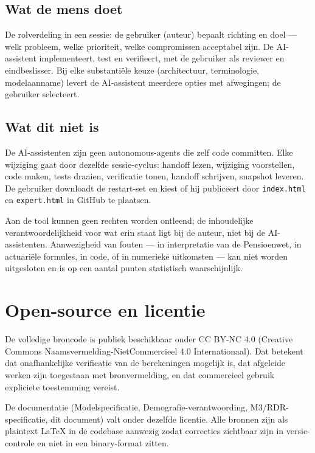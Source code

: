 \documentclass[11pt,a4paper]{article}
\newcommand{\code}[1]{\texttt{#1}}
\begin{document}
\subsection{Wat de mens doet}

De rolverdeling in een sessie: de gebruiker (auteur) bepaalt richting en doel --- welk probleem, welke prioriteit, welke compromissen acceptabel zijn. De AI-assistent implementeert, test en verifieert, met de gebruiker als reviewer en eindbeslisser. Bij elke substanti\"ele keuze (architectuur, terminologie, modelaanname) levert de AI-assistent meerdere opties met afwegingen; de gebruiker selecteert.

\subsection{Wat dit niet is}

De AI-assistenten zijn geen autonomous-agents die zelf code committen. Elke wijziging gaat door dezelfde sessie-cyclus: handoff lezen, wijziging voorstellen, code maken, tests draaien, verificatie tonen, handoff schrijven, snapshot leveren. De gebruiker downloadt de restart-set en kiest of hij publiceert door \code{index.html} en \code{expert.html} in GitHub te plaatsen.

Aan de tool kunnen geen rechten worden ontleend; de inhoudelijke verantwoordelijkheid voor wat erin staat ligt bij de auteur, niet bij de AI-assistenten. Aanwezigheid van fouten --- in interpretatie van de Pensioenwet, in actuari\"ele formules, in code, of in numerieke uitkomsten --- kan niet worden uitgesloten en is op een aantal punten statistisch waarschijnlijk.

\section{Open-source en licentie}
\label{sec:opensource}

De volledige broncode is publiek beschikbaar onder CC BY-NC 4.0 (Creative Commons Naamsvermelding-Niet\-Commercieel 4.0 Internationaal). Dat betekent dat onafhankelijke verificatie van de berekeningen mogelijk is, dat afgeleide werken zijn toegestaan met bronvermelding, en dat commercieel gebruik expliciete toestemming vereist.

De documentatie (Modelspecificatie, Demografie-verantwoording, M3/RDR-specificatie, dit document) valt onder dezelfde licentie. Alle bronnen zijn als plaintext LaTeX in de codebase aanwezig zodat correcties zichtbaar zijn in versie-controle en niet in een binary-format zitten.
\end{document}
